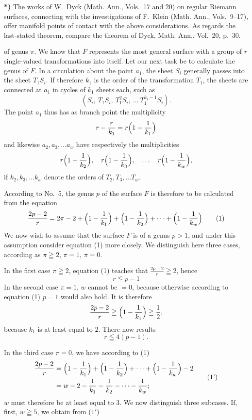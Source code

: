 \documentclass{article}
\begin{document}
\textbf{*)} The works of W.~Dyck (Math. Ann., Vols.~17 and 20) on regular Riemann surfaces, connecting with the investigations of F.~Klein (Math. Ann., Vols.~9--17), offer manifold points of contact with the above considerations. As regards the last-stated theorem, compare the theorem of Dyck, Math. Ann., Vol.~20, p.~30.

of genus $\pi$. We know that $F$ represents the most general surface with a group of $r$ single-valued transformations into itself. Let our next task be to calculate the genus of $F$. In a circulation about the point $a_1$, the sheet $S_i$ generally passes into the sheet $T_1 S_i$. If therefore $k_1$ is the order of the transformation $T_1$, the sheets are connected at $a_1$ in cycles of $k_1$ sheets each, such as
\[
(S_i, \ T_1 S_i, \ T_1^2 S_i, \ \dots \ T_1^{k_1-1} S_i).
\]
The point $a_1$ thus has as branch point the multiplicity
\[
r - \frac{r}{k_1} = r \Bigl(1 - \frac{1}{k_1}\Bigr)
\]
and likewise $a_2, a_3, \dots a_w$ have respectively the multiplicities
\[
r \Bigl(1 - \frac{1}{k_2}\Bigr), \quad r \Bigl(1 - \frac{1}{k_3}\Bigr), \quad \dots \quad r \Bigl(1 - \frac{1}{k_w}\Bigr),
\]
if $k_2, k_3, \dots k_w$ denote the orders of $T_2, T_3, \dots T_w$.

According to No.~5, the genus $p$ of the surface $F$ is therefore to be calculated from the equation
\[
\frac{2p-2}{r} = 2\pi - 2 + \Bigl(1 - \frac{1}{k_1}\Bigr) + \Bigl(1 - \frac{1}{k_2}\Bigr) + \dots + \Bigl(1 - \frac{1}{k_w}\Bigr)
\tag{1}
\]
We now wish to assume that the surface $F$ is of a genus $p > 1$, and under this assumption consider equation (1) more closely. We distinguish here three cases, according as $\pi \geqq 2$, $\pi = 1$, $\pi = 0$.

In the first case $\pi \geqq 2$, equation (1) teaches that $\frac{2p-2}{r} \geqq 2$, hence
\[
r \leqq p - 1
\tag{2}
\]
In the second case $\pi = 1$, $w$ cannot be $= 0$, because otherwise according to equation (1) $p = 1$ would also hold. It is therefore
\[
\frac{2p-2}{r} \geqq \Bigl(1 - \frac{1}{k_1}\Bigr) \geqq \frac{1}{2},
\]
because $k_1$ is at least equal to $2$. There now results
\[
r \leqq 4(p - 1).
\tag{3}
\]

In the third case $\pi = 0$, we have according to (1)
\[
\begin{aligned}
\frac{2p-2}{r} &= \Bigl(1 - \frac{1}{k_1}\Bigr) + \Bigl(1 - \frac{1}{k_2}\Bigr) + \dots + \Bigl(1 - \frac{1}{k_w}\Bigr) - 2 \\
&= w - 2 - \frac{1}{k_1} - \frac{1}{k_2} - \dots - \frac{1}{k_w};
\end{aligned}
\tag{1'}
\]
$w$ must therefore be at least equal to $3$. We now distinguish three subcases. If, first, $w \geqq 5$, we obtain from ($1'$)
\end{document}
